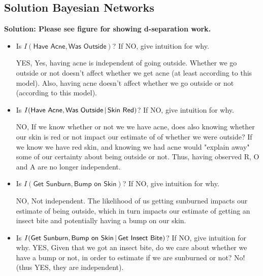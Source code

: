 \documentclass[submit]{harvardml}
\newcommand{\attr}[1]{\textsf{#1}}
\newenvironment{answer}{%
\color{answergreen}\sffamily\large}{}
\begin{document}
\subsection*{Solution Bayesian Networks}
    \textbf{Solution: Please see figure for showing d-separation work.}
\begin{itemize}
    \item Is $I(\attr{Have Acne},\attr{Was Outside})$? If NO, give
    intuition for why.

        \begin{answer}
        YES, Yes, having acne is independent of going outside. Whether we go outside or not doesn't
        affect whether we get acne (at least according to this model).
        Also, having acne doesn't affect whether we go outside or not (according to this model).
        \end{answer}

    \item Is $I(\attr{Have Acne},\attr{Was Outside}\given \attr{Skin Red})$? If NO, give
    intuition for why.

        \begin{answer}
            NO, If we know whether or not we we have acne, does also knowing whether our skin is red
            or not impact our estimate of of whether we were outside? If we know we have red skin,
            and knowing we had acne would "explain away" some of our certainty about being outside
            or not. Thus, having observed R, O and A are no longer independent.
        \end{answer}

    \item Is $I(\attr{Get Sunburn},\attr{Bump on Skin})$? If NO, give
    intuition for why.

        \begin{answer}
             NO, Not independent. The likelihood of us getting sunburned impacts our estimate of being
             outside, which in turn impacts our estimate of getting an insect bite and potentially
             having a bump on our skin. 
        \end{answer}

    \item Is $I(\attr{Get Sunburn},\attr{Bump on Skin}\given \attr{Get Insect Bite})$? If NO, give intuition for why.
        \begin{answer}
            YES, Given that we got an insect bite, do we care about whether we have a bump or not, in order to
            estimate if we are sunburned or not? No! (thus YES, they are independent).
        \end{answer}


\end{itemize}
\end{document}

